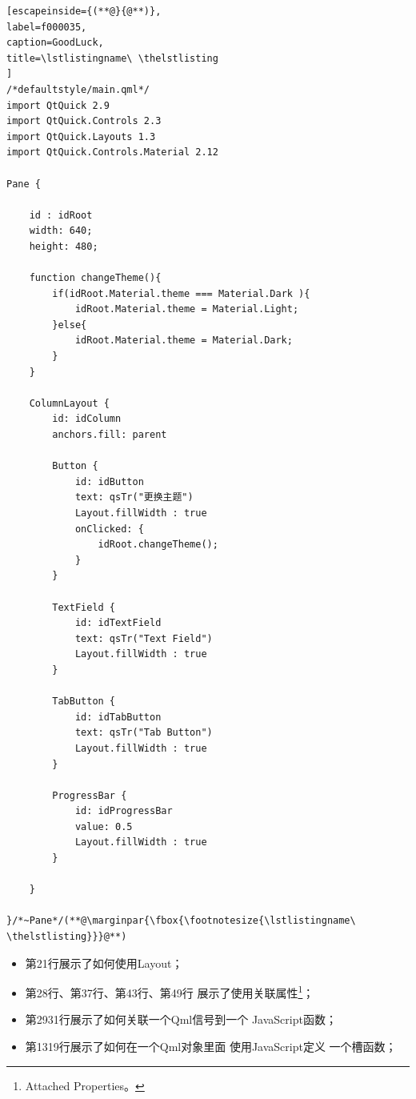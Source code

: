 \FloatBarrier
\begin{lstlisting}[escapeinside={(**@}{@**)},
label=f000035,
caption=GoodLuck,
title=\lstlistingname\ \thelstlisting
]
/*defaultstyle/main.qml*/
import QtQuick 2.9
import QtQuick.Controls 2.3
import QtQuick.Layouts 1.3
import QtQuick.Controls.Material 2.12

Pane {

    id : idRoot
    width: 640;
    height: 480;

    function changeTheme(){
        if(idRoot.Material.theme === Material.Dark ){
            idRoot.Material.theme = Material.Light;
        }else{
            idRoot.Material.theme = Material.Dark;
        }
    }

    ColumnLayout {
        id: idColumn
        anchors.fill: parent

        Button {
            id: idButton
            text: qsTr("更换主题")
            Layout.fillWidth : true
            onClicked: {
                idRoot.changeTheme();
            }
        }

        TextField {
            id: idTextField
            text: qsTr("Text Field")
            Layout.fillWidth : true
        }

        TabButton {
            id: idTabButton
            text: qsTr("Tab Button")
            Layout.fillWidth : true
        }

        ProgressBar {
            id: idProgressBar
            value: 0.5
            Layout.fillWidth : true
        }

    }

}/*~Pane*/(**@\marginpar{\fbox{\footnotesize{\lstlistingname\ \thelstlisting}}}@**)\end{lstlisting}          %

\begin{itemize}
\item 第21行展示了如何使用Layout；
\item 第28行、第37行、第43行、第49行
展示了使用关联属性\footnote{
Attached Properties。
}；
\item 第29\raisebox{0.16ex}{\sourcefonttwo\~{}}31行展示了如何关联一个Qml信号到一个
JavaScript函数；%
\item 第13\raisebox{0.16ex}{\sourcefonttwo\~{}}19行展示了如何在一个Qml对象里面
使用JavaScript定义
一个槽函数；
\end{itemize}

